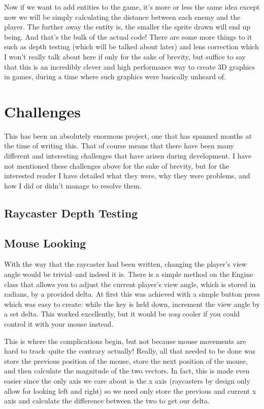 \documentclass{article}
\begin{document}
Now if we want to add entities to the game, it's more or less the same idea
except now we will be simply calculating the distance between each enemy and the
player. The further away the entity is, the smaller the sprite drawn will end up
being. And that's the bulk of the actual code! There are some more things to it
such as depth testing (which will be talked about later) and lens correction
which I won't really talk about here if only for the sake of brevity, but
suffice to say that this is an incredibly clever and high performance way to
create 3D graphics in games, during a time where such graphics were basically
unheard of.

\section{Challenges}
This has been an absolutely enormous project, one that has spanned months at the
time of writing this. That of course means that there have been many different
and interesting challenges that have arisen during development. I have not
mentioned these challenges above for the sake of brevity, but for the interested
reader I have detailed what they were, why they were problems, and how I did or
didn't manage to resolve them.

\subsection{Raycaster Depth Testing}

\subsection{Mouse Looking}
With the way that the raycaster had been written, changing the player's view
angle would be trivial--and indeed it is. There is a simple method on the Engine
class that allows you to adjust the current player's view angle, which is stored
in radians, by a provided delta. At first this was achieved with a simple button
press which was easy to create: while the key is held down, increment the view
angle by a set delta. This worked excellently, but it would be \textit{way}
cooler if you could control it with your mouse instead.

This is where the complications begin, but not because mouse movements are hard
to track--quite the contrary actually! Really, all that needed to be done was
store the previous position of the mouse, store the next position of the mouse,
and then calculate the magnitude of the two vectors. In fact, this is made even
easier since the only axis we care about is the x axis (raycasters by design
only allow for looking left and right) so we need only store the previous and
current x axis and calculate the difference between the two to get our delta.
\end{document}
